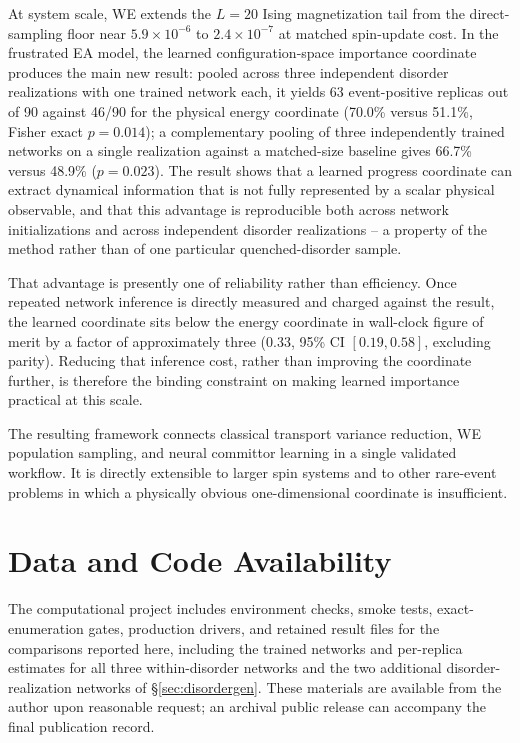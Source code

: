 \documentclass[a4paper,fleqn]{cas-sc}
\begin{document}
At system scale, WE extends the $L=20$ Ising magnetization tail from the direct-sampling floor near $5.9\times10^{-6}$ to $2.4\times10^{-7}$ at matched spin-update cost. In the frustrated EA model, the learned configuration-space importance coordinate produces the main new result: pooled across three independent disorder realizations with one trained network each, it yields 63 event-positive replicas out of 90 against 46/90 for the physical energy coordinate (70.0\% versus 51.1\%, Fisher exact $p=0.014$); a complementary pooling of three independently trained networks on a single realization against a matched-size baseline gives 66.7\% versus 48.9\% ($p=0.023$). The result shows that a learned progress coordinate can extract dynamical information that is not fully represented by a scalar physical observable, and that this advantage is reproducible both across network initializations and across independent disorder realizations -- a property of the method rather than of one particular quenched-disorder sample.

That advantage is presently one of reliability rather than efficiency. Once repeated network inference is directly measured and charged against the result, the learned coordinate sits below the energy coordinate in wall-clock figure of merit by a factor of approximately three (0.33, 95\% CI $[0.19,0.58]$, excluding parity). Reducing that inference cost, rather than improving the coordinate further, is therefore the binding constraint on making learned importance practical at this scale.

The resulting framework connects classical transport variance reduction, WE population sampling, and neural committor learning in a single validated workflow. It is directly extensible to larger spin systems and to other rare-event problems in which a physically obvious one-dimensional coordinate is insufficient.

\section*{Data and Code Availability}
The computational project includes environment checks, smoke tests, exact-enumeration gates, production drivers, and retained result files for the comparisons reported here, including the trained networks and per-replica estimates for all three within-disorder networks and the two additional disorder-realization networks of \S\ref{sec:disordergen}. These materials are available from the author upon reasonable request; an archival public release can accompany the final publication record.
\end{document}

